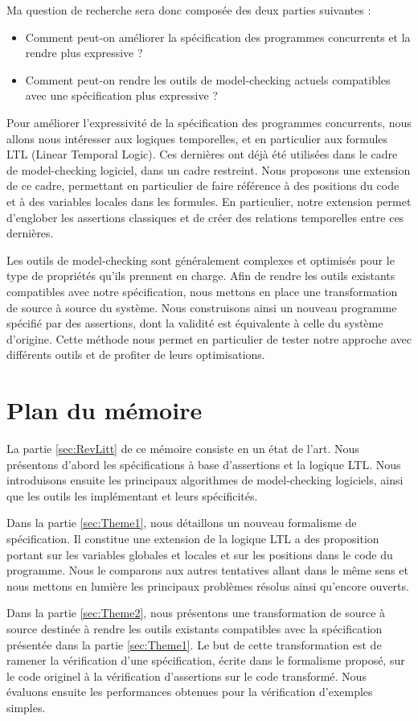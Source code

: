 Ma question de recherche sera donc composée des deux parties suivantes :

\begin{itemize}
\item
  Comment peut-on améliorer la spécification des programmes concurrents
  et la rendre plus expressive ?
\item
  Comment peut-on rendre les outils de model-checking actuels
  compatibles avec une spécification plus expressive ?
\end{itemize}

Pour améliorer l'expressivité de la spécification des programmes concurrents,
nous allons nous intéresser aux logiques temporelles, et en particulier aux
formules LTL (Linear Temporal Logic). Ces dernières ont déjà été utilisées dans
le cadre de model-checking logiciel, dans un cadre restreint. Nous proposons une
extension de ce cadre, permettant en particulier de faire référence à des
positions du code et à des variables locales dans les formules. En particulier,
notre extension permet d'englober les assertions classiques et de créer des
relations temporelles entre ces dernières.

Les outils de model-checking sont généralement complexes et optimisés
pour le type de propriétés qu'ils prennent en charge. Afin de rendre
les outils existants compatibles avec notre spécification, nous mettons
en place une transformation de source à source du système. Nous
construisons ainsi un nouveau programme spécifié par des assertions,
dont la validité est équivalente à celle du système d'origine. Cette
méthode nous permet en particulier de tester notre approche avec
différents outils et de profiter de leurs optimisations.

\section{Plan du mémoire}  %

La partie \ref{sec:RevLitt} de ce mémoire consiste en un état de l'art. Nous présentons
d'abord les spécifications à base d'assertions et la logique \ac{LTL}. Nous
introduisons ensuite les principaux algorithmes de model-checking
logiciels, ainsi que les outils les implémentant et leurs spécificités.

Dans la partie \ref{sec:Theme1}, nous détaillons un nouveau formalisme de
spécification. Il constitue une extension de la logique LTL a des proposition
portant sur les variables globales et locales et sur les positions dans le code
du programme. Nous le comparons aux autres tentatives allant dans le même sens
et nous mettons en lumière les principaux problèmes résolus ainsi qu'encore ouverts.

Dans la partie \ref{sec:Theme2}, nous présentons une transformation de source à
source destinée à rendre les outils existants compatibles avec la spécification
présentée dans la partie \ref{sec:Theme1}. Le but de cette transformation est de
ramener la vérification d'une spécification, écrite dans le formalisme proposé,
sur le code originel à la vérification d'assertions sur le code transformé.
Nous évaluons ensuite les performances obtenues
pour la vérification d'exemples simples.
